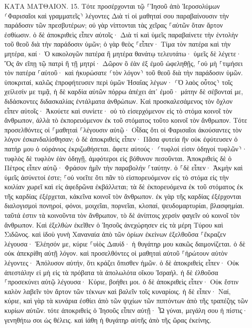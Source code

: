 \documentclass[twoside, 9pt]{extreport}
\begin{document}
ΚΑΤΑ ΜΑΤΘΑΙΟΝ.
15.
Τότε προσέρχονται τῷ ⸀Ἰησοῦ ἀπὸ Ἱεροσολύμων ⸂Φαρισαῖοι καὶ γραμματεῖς⸃ λέγοντες 
Διὰ τί οἱ μαθηταί σου παραβαίνουσιν τὴν παράδοσιν τῶν πρεσβυτέρων; οὐ γὰρ νίπτονται τὰς χεῖρας ⸀αὐτῶν ὅταν ἄρτον ἐσθίωσιν. 
ὁ δὲ ἀποκριθεὶς εἶπεν αὐτοῖς· Διὰ τί καὶ ὑμεῖς παραβαίνετε τὴν ἐντολὴν τοῦ θεοῦ διὰ τὴν παράδοσιν ὑμῶν; 
ὁ γὰρ θεὸς ⸀εἶπεν· Τίμα τὸν πατέρα καὶ τὴν μητέρα, καί· Ὁ κακολογῶν πατέρα ἢ μητέρα θανάτῳ τελευτάτω· 
ὑμεῖς δὲ λέγετε· Ὃς ἂν εἴπῃ τῷ πατρὶ ἢ τῇ μητρί· Δῶρον ὃ ἐὰν ἐξ ἐμοῦ ὠφεληθῇς, 
⸀οὐ μὴ ⸀τιμήσει τὸν πατέρα ⸀αὐτοῦ· καὶ ἠκυρώσατε ⸂τὸν λόγον⸃ τοῦ θεοῦ διὰ τὴν παράδοσιν ὑμῶν. 
ὑποκριταί, καλῶς ἐπροφήτευσεν περὶ ὑμῶν Ἠσαΐας λέγων· 
⸂Ὁ λαὸς οὗτος⸃ τοῖς χείλεσίν με τιμᾷ, ἡ δὲ καρδία αὐτῶν πόρρω ἀπέχει ἀπ᾽ ἐμοῦ· 
μάτην δὲ σέβονταί με, διδάσκοντες διδασκαλίας ἐντάλματα ἀνθρώπων. 
Καὶ προσκαλεσάμενος τὸν ὄχλον εἶπεν αὐτοῖς· Ἀκούετε καὶ συνίετε· 
οὐ τὸ εἰσερχόμενον εἰς τὸ στόμα κοινοῖ τὸν ἄνθρωπον, ἀλλὰ τὸ ἐκπορευόμενον ἐκ τοῦ στόματος τοῦτο κοινοῖ τὸν ἄνθρωπον. 
Τότε προσελθόντες οἱ ⸀μαθηταὶ ⸀λέγουσιν αὐτῷ· Οἶδας ὅτι οἱ Φαρισαῖοι ἀκούσαντες τὸν λόγον ἐσκανδαλίσθησαν; 
ὁ δὲ ἀποκριθεὶς εἶπεν· Πᾶσα φυτεία ἣν οὐκ ἐφύτευσεν ὁ πατήρ μου ὁ οὐράνιος ἐκριζωθήσεται. 
ἄφετε αὐτούς· ⸂τυφλοί εἰσιν ὁδηγοί τυφλῶν⸃· τυφλὸς δὲ τυφλὸν ἐὰν ὁδηγῇ, ἀμφότεροι εἰς βόθυνον πεσοῦνται. 
Ἀποκριθεὶς δὲ ὁ Πέτρος εἶπεν αὐτῷ· Φράσον ἡμῖν τὴν παραβολήν ⸀ταύτην. 
ὁ ⸀δὲ εἶπεν· Ἀκμὴν καὶ ὑμεῖς ἀσύνετοί ἐστε; 
⸀οὐ νοεῖτε ὅτι πᾶν τὸ εἰσπορευόμενον εἰς τὸ στόμα εἰς τὴν κοιλίαν χωρεῖ καὶ εἰς ἀφεδρῶνα ἐκβάλλεται; 
τὰ δὲ ἐκπορευόμενα ἐκ τοῦ στόματος ἐκ τῆς καρδίας ἐξέρχεται, κἀκεῖνα κοινοῖ τὸν ἄνθρωπον. 
ἐκ γὰρ τῆς καρδίας ἐξέρχονται διαλογισμοὶ πονηροί, φόνοι, μοιχεῖαι, πορνεῖαι, κλοπαί, ψευδομαρτυρίαι, βλασφημίαι. 
ταῦτά ἐστιν τὰ κοινοῦντα τὸν ἄνθρωπον, τὸ δὲ ἀνίπτοις χερσὶν φαγεῖν οὐ κοινοῖ τὸν ἄνθρωπον. 
Καὶ ἐξελθὼν ἐκεῖθεν ὁ Ἰησοῦς ἀνεχώρησεν εἰς τὰ μέρη Τύρου καὶ Σιδῶνος. 
καὶ ἰδοὺ γυνὴ Χαναναία ἀπὸ τῶν ὁρίων ἐκείνων ἐξελθοῦσα ⸀ἔκραζεν λέγουσα· Ἐλέησόν με, κύριε ⸀υἱὸς Δαυίδ· ἡ θυγάτηρ μου κακῶς δαιμονίζεται. 
ὁ δὲ οὐκ ἀπεκρίθη αὐτῇ λόγον. καὶ προσελθόντες οἱ μαθηταὶ αὐτοῦ ⸀ἠρώτουν αὐτὸν λέγοντες· Ἀπόλυσον αὐτήν, ὅτι κράζει ὄπισθεν ἡμῶν. 
ὁ δὲ ἀποκριθεὶς εἶπεν· Οὐκ ἀπεστάλην εἰ μὴ εἰς τὰ πρόβατα τὰ ἀπολωλότα οἴκου Ἰσραήλ. 
ἡ δὲ ἐλθοῦσα ⸀προσεκύνει αὐτῷ λέγουσα· Κύριε, βοήθει μοι. 
ὁ δὲ ἀποκριθεὶς εἶπεν· Οὐκ ἔστιν καλὸν λαβεῖν τὸν ἄρτον τῶν τέκνων καὶ βαλεῖν τοῖς κυναρίοις. 
ἡ δὲ εἶπεν· Ναί, κύριε, καὶ γὰρ τὰ κυνάρια ἐσθίει ἀπὸ τῶν ψιχίων τῶν πιπτόντων ἀπὸ τῆς τραπέζης τῶν κυρίων αὐτῶν. 
τότε ἀποκριθεὶς ὁ Ἰησοῦς εἶπεν αὐτῇ· Ὦ γύναι, μεγάλη σου ἡ πίστις· γενηθήτω σοι ὡς θέλεις. καὶ ἰάθη ἡ θυγάτηρ αὐτῆς ἀπὸ τῆς ὥρας ἐκείνης. 
\end{document}
